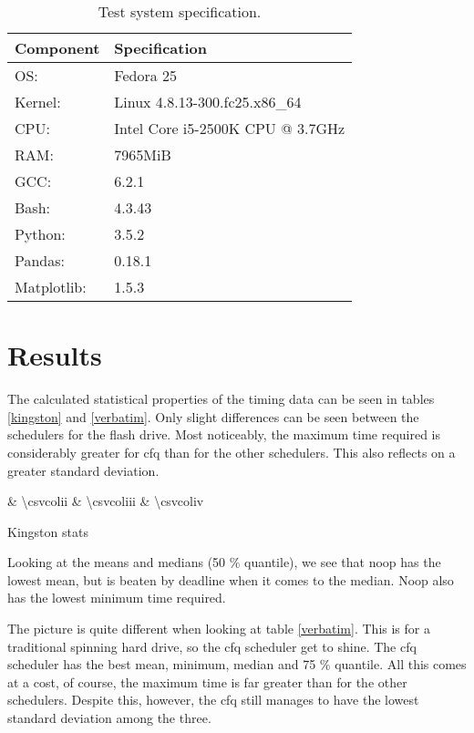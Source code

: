 \documentclass[12pt, a4paper]{article} %
\begin{document}
\begin{table}[ht]
	\centering
	\begin{tabular}{ll}
		\toprule
		Component & Specification \\
		\midrule
		OS: & Fedora 25 \\
		Kernel: & Linux 4.8.13-300.fc25.x86\_64 \\
		CPU: & Intel Core i5-2500K CPU @ 3.7GHz \\
		RAM: & 7965MiB \\
		GCC: & 6.2.1 \\
		Bash: & 4.3.43 \\
		Python: & 3.5.2 \\
		Pandas: & 0.18.1 \\
		Matplotlib: & 1.5.3 \\
		\hline
	\end{tabular}
	\caption{Test system specification.}
	\label{spec}
\end{table}

\section{Results}

The calculated statistical properties of the timing data can be seen in tables \ref{kingston} and \ref{verbatim}.
Only slight differences can be seen between the schedulers for the flash drive.
Most noticeably, the maximum time required is considerably greater for cfq than for the other schedulers.
This also reflects on a greater standard deviation.

\begin{table}[ht]
	\centering
	{\csvcoli & \num{\csvcolii} & \num{\csvcoliii} & \num{\csvcoliv}}
	\caption{Kingston stats}
	\label{kingston}
\end{table}

Looking at the means and medians (50 \% quantile), we see that noop has the lowest mean, but is beaten by deadline when it comes to the median.
Noop also has the lowest minimum time required.

The picture is quite different when looking at table \ref{verbatim}.
This is for a traditional spinning hard drive, so the cfq scheduler get to shine.
The cfq scheduler has the best mean, minimum, median and 75 \% quantile.
All this comes at a cost, of course, the maximum time is far greater than for the other schedulers.
Despite this, however, the cfq still manages to have the lowest standard deviation among the three.
\end{document}
